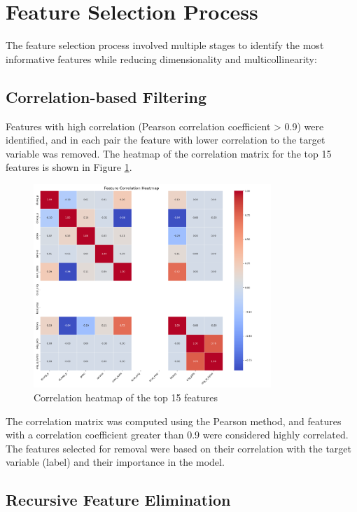 \section{Feature Selection Process}

The feature selection process involved multiple stages to identify the most informative features while reducing dimensionality and multicollinearity:

\subsection{Correlation-based Filtering}

Features with high correlation (Pearson correlation coefficient > 0.9) were identified, and in each pair the feature with lower correlation to the target variable was removed. The heatmap of the correlation matrix for the top 15 features is shown in Figure \ref{fig:correlation_heatmap}.

\begin{figure}[h]
    \centering
    \includegraphics[width=0.8\textwidth]{figures/feature_correlation.png}
    \caption{Correlation heatmap of the top 15 features}
    \label{fig:correlation_heatmap}
\end{figure}
The correlation matrix was computed using the Pearson method, and features with a correlation coefficient greater than 0.9 were considered highly correlated. The features selected for removal were based on their correlation with the target variable (label) and their importance in the model.

\subsection{Recursive Feature Elimination}

